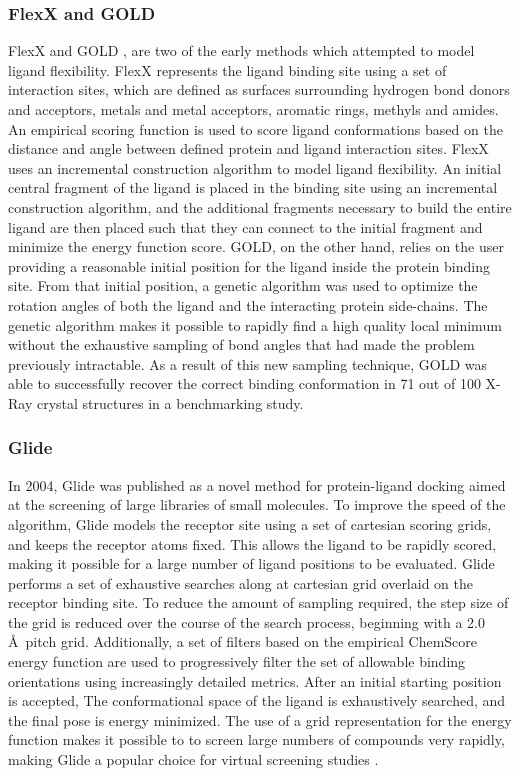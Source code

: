 \subsubsection{FlexX and GOLD}
FlexX \citep{Rarey:1996hf} and \ac{GOLD} \citep{Jones:1997bl}, are two of the early methods which attempted to model ligand flexibility.
FlexX represents the ligand binding site using a set of interaction sites, which are defined as surfaces surrounding hydrogen bond donors and acceptors, metals and metal acceptors, aromatic rings, methyls and amides.
An empirical scoring function is used to score ligand conformations based on the distance and angle between defined protein and ligand interaction sites.
FlexX uses an incremental construction algorithm to model ligand flexibility.
An initial central fragment of the ligand is placed in the binding site using an incremental construction algorithm, and the additional fragments necessary to build the entire ligand are then placed such that they can connect to the initial fragment and minimize the energy function score. 
\ac{GOLD}, on the other hand, relies on the user providing a reasonable initial position for the ligand inside the protein binding site.
From that initial position, a genetic algorithm \citep{Jones:1995vw} was used to optimize the rotation angles of both the ligand and the interacting protein side-chains. 
The genetic algorithm makes it possible to rapidly find a high quality local minimum without the exhaustive sampling of bond angles that had made the problem previously intractable.
As a result of this new sampling technique, \ac{GOLD} was able to successfully recover the correct binding conformation in 71 out of 100 X-Ray crystal structures in a benchmarking study. 

\subsubsection{Glide}
In 2004, Glide \citep{Friesner:2004hm} was published as a novel method for protein-ligand docking aimed at the screening of large libraries of small molecules.
To improve the speed of the algorithm, Glide models the receptor site using a set of cartesian scoring grids, and keeps the receptor atoms fixed.
This allows the ligand to be rapidly scored, making it possible for a large number of ligand positions to be evaluated.
Glide performs a set of exhaustive searches along at cartesian grid overlaid on the receptor binding site.
To reduce the amount of sampling required, the step size of the grid is reduced over the course of the search process, beginning with a 2.0 \AA\ pitch grid.
Additionally, a set of filters based on the empirical ChemScore \citep{Eldridge:1997tm} energy function are used to progressively filter the set of allowable binding orientations using increasingly detailed metrics.
After an initial starting position is accepted, The conformational space of the ligand is exhaustively searched, and the final pose is energy minimized.
The use of a grid representation for the energy function makes it possible to to screen large numbers of compounds very rapidly, making Glide a popular choice for virtual screening studies \citep{Yilmaz:2013dj,Bauer:2013de}.

